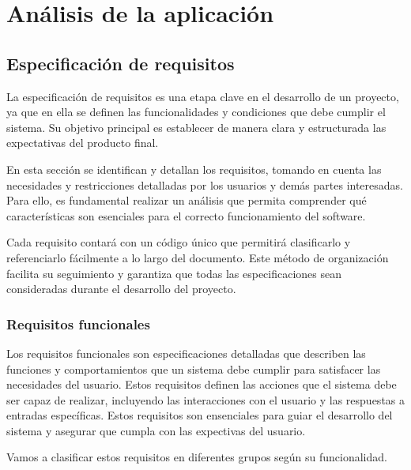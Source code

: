 \chapter{Análisis de la aplicación}
\label{cap:analisis_aplicacion} 



\section{Especificación de requisitos}
\label{sec:requisitos}
La especificación de requisitos es una etapa clave en el desarrollo de un proyecto, ya que en ella se definen las funcionalidades y condiciones que debe cumplir el sistema. Su objetivo principal
es establecer de manera clara y estructurada las expectativas del producto final.

En esta sección se identifican y detallan los requisitos, tomando en cuenta las necesidades y restricciones detalladas por los 
usuarios y demás partes interesadas. Para ello, es fundamental realizar un análisis que permita comprender qué características son esenciales 
para el correcto funcionamiento del software.

Cada requisito contará con un código único que permitirá clasificarlo y referenciarlo fácilmente a lo largo del documento. Este método de organización facilita su seguimiento y garantiza que 
todas las especificaciones sean consideradas durante el desarrollo del proyecto. 

\subsection{Requisitos funcionales}
\label{subsec:requisitos_funcionales}
Los requisitos funcionales son especificaciones detalladas que describen las funciones y comportamientos que un sistema debe cumplir para 
satisfacer las necesidades del usuario. Estos requisitos definen las acciones que el sistema debe ser capaz de realizar, incluyendo las interacciones
con el usuario y las respuestas a entradas específicas. Estos requisitos son ensenciales para guiar el desarrollo del sistema y asegurar que cumpla con las expectivas del usuario. \cite{pmo2017}

Vamos a clasificar estos requisitos en diferentes grupos según su funcionalidad. 

